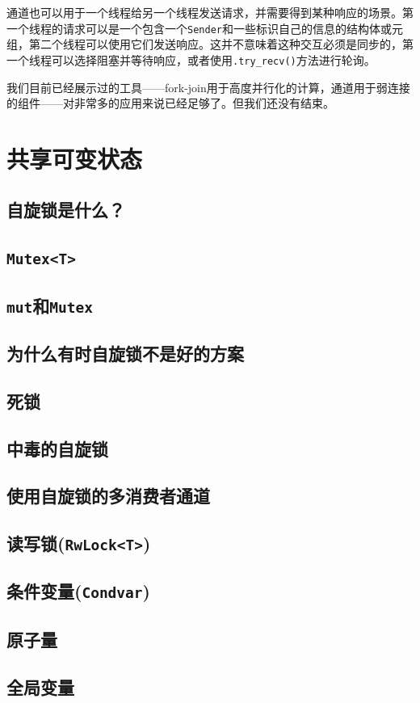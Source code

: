 通道也可以用于一个线程给另一个线程发送请求，并需要得到某种响应的场景。第一个线程的请求可以是一个包含一个\texttt{Sender}和一些标识自己的信息的结构体或元组，第二个线程可以使用它们发送响应。这并不意味着这种交互必须是同步的，第一个线程可以选择阻塞并等待响应，或者使用\texttt{.try\_recv()}方法进行轮询。

我们目前已经展示过的工具——fork-join用于高度并行化的计算，通道用于弱连接的组件——对非常多的应用来说已经足够了。但我们还没有结束。

\section{共享可变状态}

\subsection{自旋锁是什么？}

\subsection{\texttt{Mutex<T>}}\label{mutex}

\subsection{\texttt{mut}和\texttt{Mutex}}

\subsection{为什么有时自旋锁不是好的方案}

\subsection{死锁}

\subsection{中毒的自旋锁}

\subsection{使用自旋锁的多消费者通道}

\subsection{读写锁(\texttt{RwLock<T>})}

\subsection{条件变量(\texttt{Condvar})}

\subsection{原子量}\label{atomic}

\subsection{全局变量}\label{globalvar}
